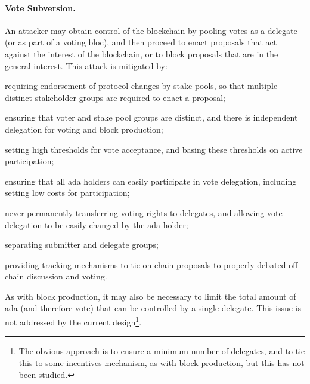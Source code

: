 \paragraph{Vote Subversion.}
An attacker may obtain control of the blockchain by pooling votes as a delegate (or as part of a voting bloc), and then proceed to enact proposals that act against the interest of the blockchain, or to block
proposals that are in the general interest.   This attack is mitigated by:
  \begin{inparaenum}
  \item
    requiring endorsement of protocol changes by stake pools, so that multiple distinct stakeholder groups are required to enact a proposal;
  \item
    ensuring that voter and stake pool groups are distinct, and there is independent delegation for voting and block production;
  \item
    setting high thresholds for vote acceptance, and basing these thresholds on active participation;
  \item
    ensuring that all ada holders can easily participate in vote delegation, including setting low costs for participation;
  \item
    never permanently transferring voting rights to delegates, and allowing vote delegation to be easily changed by the ada holder;
  \item
    separating submitter and delegate groups;
  \item
    providing tracking mechanisms to tie on-chain proposals to properly debated off-chain discussion and voting.
  \end{inparaenum}

  As with block production, it may also be necessary to limit the total amount of ada (and therefore vote) that can be controlled by a single delegate.
  This issue is not addressed by the current design\footnote{The obvious approach is to ensure a minimum number of delegates, and to tie this to
    some incentives mechanism, as with block production, but this has not been studied.}.

